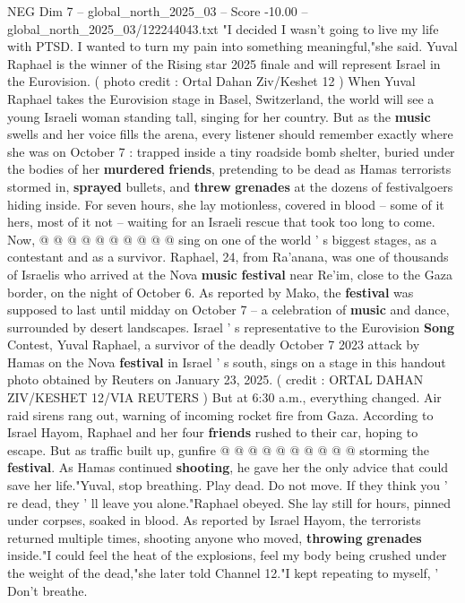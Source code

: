\begin{textsample}{NEG Dim 7 – global\_north\_2025\_03 – Score -10.00 – global\_north\_2025\_03/122244043.txt}  \label{ex:f7_neg_121}
"I decided I wasn't going to live my life with PTSD.
I wanted to turn my pain into something meaningful,"she said.
Yuval Raphael is the winner of the Rising star 2025 finale and will represent Israel in the Eurovision. ( photo credit : Ortal Dahan Ziv/Keshet 12 ) When Yuval Raphael takes the Eurovision stage in Basel, Switzerland, the world will see a young Israeli woman standing tall, singing for her country.
But as the \textbf{music} swells and her voice fills the arena, every listener should remember exactly where she was on October 7 : trapped inside a tiny roadside bomb shelter, buried under the bodies of her \textbf{murdered} \textbf{friends}, pretending to be dead as Hamas terrorists stormed in, \textbf{sprayed} bullets, and \textbf{threw} \textbf{grenades} at the dozens of festivalgoers hiding inside.
For seven hours, she lay motionless, covered in blood -- some of it hers, most of it not -- waiting for an Israeli rescue that took too long to come.
Now, @ @ @ @ @ @ @ @ @ @ sing on one of the world ' s biggest stages, as a contestant and as a survivor.
Raphael, 24, from Ra'anana, was one of thousands of Israelis who arrived at the Nova \textbf{music} \textbf{festival} near Re'im, close to the Gaza border, on the night of October 6.
As reported by Mako, the \textbf{festival} was supposed to last until midday on October 7 -- a celebration of \textbf{music} and dance, surrounded by desert landscapes.
Israel ' s representative to the Eurovision \textbf{Song} Contest, Yuval Raphael, a survivor of the deadly October 7 2023 attack by Hamas on the Nova \textbf{festival} in Israel ' s south, sings on a stage in this handout photo obtained by Reuters on January 23, 2025. ( credit : ORTAL DAHAN ZIV/KESHET 12/VIA REUTERS ) But at 6:30 a.m., everything changed.
Air raid sirens rang out, warning of incoming rocket fire from Gaza.
According to Israel Hayom, Raphael and her four \textbf{friends} rushed to their car, hoping to escape.
But as traffic built up, gunfire @ @ @ @ @ @ @ @ @ @ storming the \textbf{festival}.
As Hamas continued \textbf{shooting}, he gave her the only advice that could save her life."Yuval, stop breathing.
Play dead.
Do not move.
If they think you ' re dead, they ' ll leave you alone."Raphael obeyed.
She lay still for hours, pinned under corpses, soaked in blood.
As reported by Israel Hayom, the terrorists returned multiple times, shooting anyone who moved, \textbf{throwing} \textbf{grenades} inside."I could feel the heat of the explosions, feel my body being crushed under the weight of the dead,"she later told Channel 12."I kept repeating to myself, ' Don't breathe.

\end{textsample}
